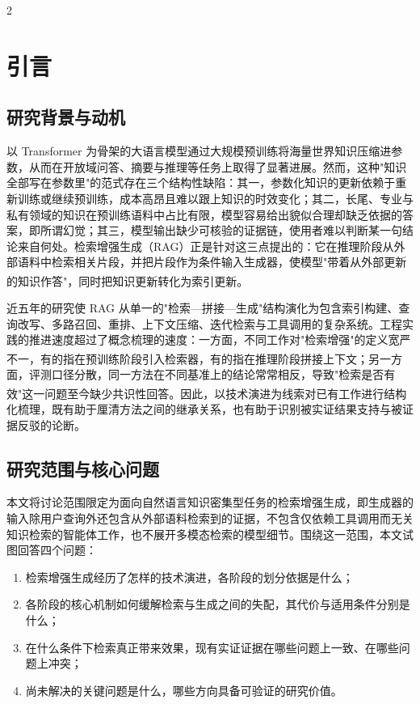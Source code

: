 \documentclass[10.5pt,compsoc,UTF8]{CjC}
\theoremstyle{mystyle}
\newcommand{\upcite}[1]{\textsuperscript{\cite{#1}}}
\begin{document}
\begin{multicols}{2}
\section{\heiti 引言}

\subsection{\heiti 研究背景与动机}

以 Transformer 为骨架的大语言模型通过大规模预训练将海量世界知识压缩进参数，从而在开放域问答、摘要与推理等任务上取得了显著进展。然而，这种"知识全部写在参数里"的范式存在三个结构性缺陷：其一，参数化知识的更新依赖于重新训练或继续预训练，成本高昂且难以跟上知识的时效变化；其二，长尾、专业与私有领域的知识在预训练语料中占比有限，模型容易给出貌似合理却缺乏依据的答案，即所谓幻觉；其三，模型输出缺少可核验的证据链，使用者难以判断某一句结论来自何处。检索增强生成（RAG）正是针对这三点提出的：它在推理阶段从外部语料中检索相关片段，并把片段作为条件输入生成器，使模型"带着从外部更新的知识作答"，同时把知识更新转化为索引更新\upcite{lewis2020retrieval,gao2023retrieval}。

近五年的研究使 RAG 从单一的"检索—拼接—生成"结构演化为包含索引构建、查询改写、多路召回、重排、上下文压缩、迭代检索与工具调用的复杂系统。工程实践的推进速度超过了概念梳理的速度：一方面，不同工作对"检索增强"的定义宽严不一，有的指在预训练阶段引入检索器\upcite{guu2020realm,borgeaud2021improving}，有的指在推理阶段拼接上下文\upcite{ram2023context}；另一方面，评测口径分散，同一方法在不同基准上的结论常常相反，导致"检索是否有效"这一问题至今缺少共识性回答\upcite{li2024retrieval,liu2024lost}。因此，以技术演进为线索对已有工作进行结构化梳理，既有助于厘清方法之间的继承关系，也有助于识别被实证结果支持与被证据反驳的论断。

\subsection{\heiti 研究范围与核心问题}

本文将讨论范围限定为面向自然语言知识密集型任务的检索增强生成，即生成器的输入除用户查询外还包含从外部语料检索到的证据，不包含仅依赖工具调用而无关知识检索的智能体工作，也不展开多模态检索的模型细节。围绕这一范围，本文试图回答四个问题：

\begin{enumerate}
\item 检索增强生成经历了怎样的技术演进，各阶段的划分依据是什么；
\item 各阶段的核心机制如何缓解检索与生成之间的失配，其代价与适用条件分别是什么；
\item 在什么条件下检索真正带来效果，现有实证证据在哪些问题上一致、在哪些问题上冲突；
\item 尚未解决的关键问题是什么，哪些方向具备可验证的研究价值。
\end{enumerate}


\end{multicols}
\end{document}
